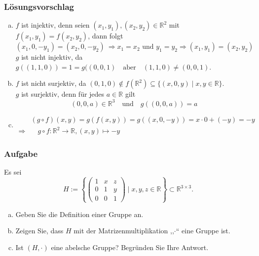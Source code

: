 \documentclass[a4paper,11pt]{scrartcl}
\newcounter{auf}
\newcommand{\Aufgabe}%
        {\addtocounter{auf}{1} \subsubsection*{\rmfamily  Aufgabe \theauf \hspace{1em}} }
\newcommand{\RR}{\mathbb{R}}
\begin{document}
\subsubsection*{Lösungsvorschlag}
\begin{enumerate}[a)]

\item $f$ ist injektiv, denn seien $(x_1,y_1),(x_2,y_2) \in \RR^2$ mit $f(x_1,y_1)=f(x_2,y_2)$, dann folgt
$$
(x_1,0,-y_1)=(x_2,0,-y_2) \ \Rightarrow x_1=x_2 \text{ und } y_1=y_2 \Rightarrow (x_1,y_1)=(x_2,y_2)
$$
$g$ ist nicht injektiv, da $g((1,1,0))=1=g((0,0,1) \quad \text{aber} \quad (1,1,0) \ne (0,0,1)$.
\item $f$ ist nicht surjektiv, da $(0,1,0) \notin f(\RR^2) \subseteq \{(x,0,y)\mid x,y \in \RR\} $.\\
$g$ ist surjektiv, denn für jedes $a \in \RR$ gilt
$$
(0,0,a) \in \RR^3 \quad \text{und} \quad g((0,0,a))=a
$$
\item
\begin{align*}
&(g\circ f)(x,y)=g(f(x,y))=g((x,0,-y))=x\cdot 0 +(-y)=-y\\
\Rightarrow&\quad g\circ f :\RR^2 \to \RR, (x,y) \mapsto -y
\end{align*}
\end{enumerate}



\newpage
\Aufgabe
Es sei 
$$
H:=\left\{\begin{pmatrix} 1&x&z\\0&1&y\\0&0&1 \end{pmatrix} \mid x,y,z \in \RR \right\} \subset \RR^{3\times 3}.
$$
\begin{enumerate}[a)]
\item Geben Sie die Definition einer Gruppe an.

\item Zeigen Sie, dass $H$ mit der Matrizenmultiplikation ,,$\cdot$`` eine Gruppe ist.

\item Ist $(H,\cdot)$ eine abelsche Gruppe? Begründen Sie Ihre Antwort.

\end{enumerate}

%
%
\end{document}
